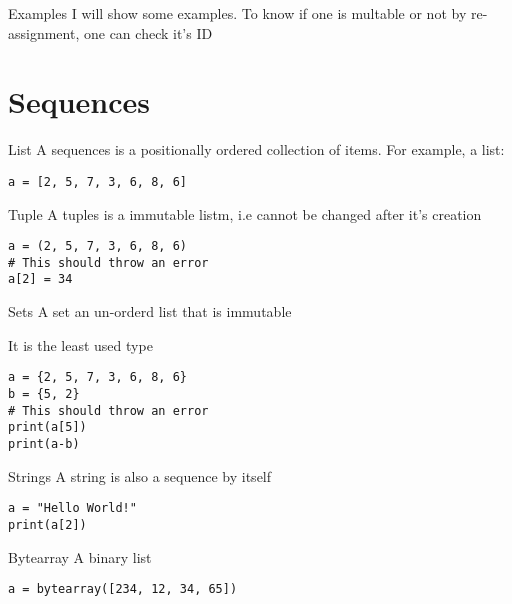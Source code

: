 \begin{frame}[containsverbatim]{Examples}
    I will show some examples. To know if one is multable or not by re-assignment, one can check it's ID
\end{frame}

\section{Sequences}

\begin{frame}[containsverbatim]{List}
    A sequences is a positionally ordered collection of items. For example, a list:
    \begin{verbatim}
a = [2, 5, 7, 3, 6, 8, 6]
    \end{verbatim}
\end{frame}

\begin{frame}[containsverbatim]{Tuple}
    A tuples is a immutable listm, i.e cannot be changed after it's creation
    \begin{verbatim}
a = (2, 5, 7, 3, 6, 8, 6)
# This should throw an error
a[2] = 34
    \end{verbatim}
\end{frame}

\begin{frame}[containsverbatim]{Sets}
    A set an un-orderd list that is immutable

    It is the least used type
    \begin{verbatim}
a = {2, 5, 7, 3, 6, 8, 6}
b = {5, 2}
# This should throw an error
print(a[5])
print(a-b)
    \end{verbatim}
\end{frame}

\begin{frame}[containsverbatim]{Strings}
    A string is also a sequence by itself
    \begin{verbatim}
a = "Hello World!"
print(a[2])
    \end{verbatim}
\end{frame}

\begin{frame}[containsverbatim]{Bytearray}
    A binary list
    \begin{verbatim}
a = bytearray([234, 12, 34, 65])
    \end{verbatim}
\end{frame}

